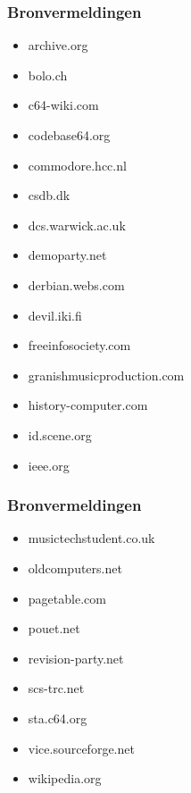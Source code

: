 
\begin{frame}
\frametitle{Bronvermeldingen}

\begin{multicols}{2}
\begin{itemize}
\item archive.org
\item bolo.ch
\item c64-wiki.com
\item codebase64.org
\item commodore.hcc.nl
\item csdb.dk
\item dcs.warwick.ac.uk
\item demoparty.net
\item derbian.webs.com
\item devil.iki.fi
\item freeinfosociety.com
\item granishmusicproduction.com
\item history-computer.com
\item id.scene.org
\item ieee.org
\end{itemize}
\end{multicols}

\end{frame}


\begin{frame}
\frametitle{Bronvermeldingen}

\begin{multicols}{2}
\begin{itemize}
\item musictechstudent.co.uk
\item oldcomputers.net
\item pagetable.com
\item pouet.net
\item revision-party.net
\item scs-trc.net
\item sta.c64.org
\item vice.sourceforge.net
\item wikipedia.org
\end{itemize}
\end{multicols}

\end{frame}

